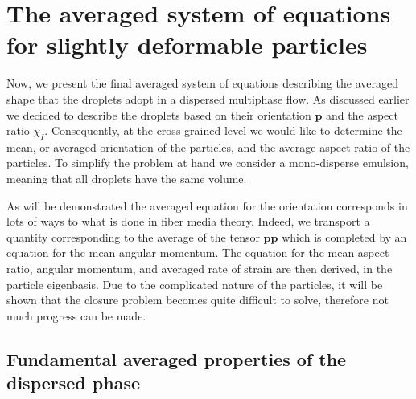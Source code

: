 \section{The averaged system of equations for slightly deformable particles}
\label{sec:averaged_eq}


Now, we present the final averaged system of equations describing the averaged shape that the droplets adopt in a dispersed multiphase flow. 
As discussed earlier we decided to describe the droplets based on their orientation $\textbf{p}$ and the aspect ratio $\chi_I$.
Consequently, at the cross-grained level we would like to determine the mean, or averaged orientation of the particles, and the average aspect ratio of the particles.  
To simplify the problem at hand we consider a mono-disperse emulsion, meaning that all droplets have the same volume. 

As will be demonstrated the averaged equation for the orientation corresponds in lots of ways to what is done in fiber media theory. 
Indeed, we transport a quantity corresponding to the average of the tensor $\textbf{pp}$ which is completed by an equation for the mean angular momentum. 
The equation for the mean aspect ratio, angular momentum, and averaged rate of strain are then derived, in the particle eigenbasis.
Due to the complicated nature of the particles, it will be shown that the closure problem becomes quite difficult to solve, therefore not much progress can be made. 

\subsection{Fundamental averaged properties of the dispersed phase} 

